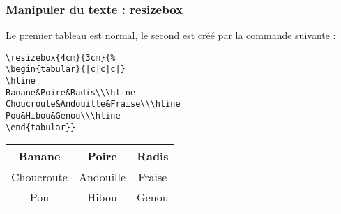 \documentclass[10pt,hyperref={pdfpagemode=FullScreen},xcolor=dvipsnames,xcolor=table, xcolor=svgnames]{beamer}%
\begin{document}
 \begin{frame}[fragile]
   \frametitle{Manipuler du texte : resizebox}
Le premier tableau est normal, le second est créé par la commande suivante :
\begin{exampleblock}{}
\begin{verbatim}
\resizebox{4cm}{3cm}{%
\begin{tabular}{|c|c|c|}
\hline
Banane&Poire&Radis\\\hline
Choucroute&Andouille&Fraise\\\hline
Pou&Hibou&Genou\\\hline
\end{tabular}}  
\end{verbatim}
\end{exampleblock}
\begin{block}{} \hspace{1cm}
\begin{tabular}{|c|c|c|}
\hline
Banane&Poire&Radis\\\hline
Choucroute&Andouille&Fraise\\\hline
Pou&Hibou&Genou\\\hline
\end{tabular}\hfill
{} \hspace{1cm}
\end{block}
\end{frame}
\end{document}
